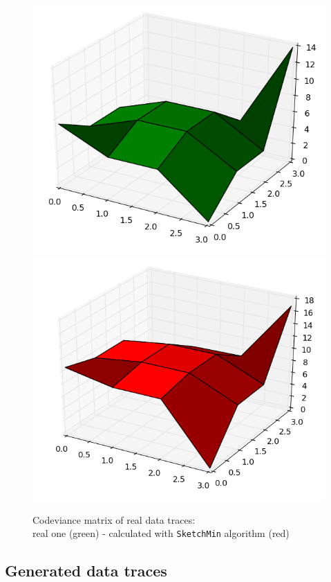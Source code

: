 \documentclass[a4paper]{article}%
\begin{document}
\begin{figure}[H]
	\center
	\includegraphics[scale=0.35]{realtests_real1.png}
	\includegraphics[scale=0.35]{realtests_sketchmin1.png}
	\caption{\footnotesize Codeviance matrix of real data traces: \\ real one (green) - calculated with \texttt{SketchMin} algorithm (red)}
	\label{ref:exp_real}
\end{figure}



\subsection{Generated data traces}
\end{document}
